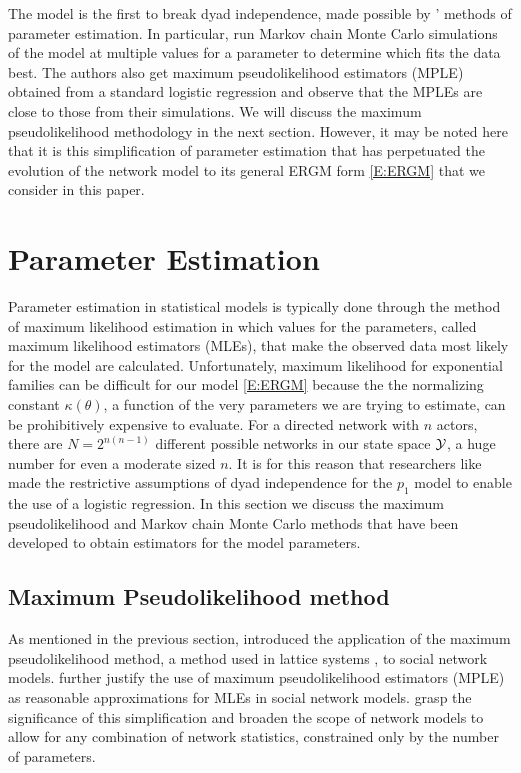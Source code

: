 The model is the first to break dyad independence, made possible by \citeauthor{Frank:1986}' methods of parameter estimation.  In particular, \citeauthor{Frank:1986} run Markov chain Monte Carlo simulations of the model at multiple values for a parameter to determine which fits the data best.  The authors also get maximum pseudolikelihood estimators (MPLE) obtained from a standard logistic regression and observe that the MPLEs are close to those from their simulations.  We will discuss the maximum pseudolikelihood methodology in the next section.  However, it may be noted here that it is this simplification of parameter estimation that has perpetuated the evolution of the network model to its general ERGM form \eqref{E:ERGM} that we consider in this paper.  



\section{Parameter Estimation}
Parameter estimation in statistical models is typically done through the method of maximum likelihood estimation in which values for the parameters, called maximum likelihood estimators (MLEs), that make the observed data most likely for the model are calculated.  Unfortunately, maximum likelihood for exponential families can be difficult for our model \eqref{E:ERGM} because the the normalizing constant $\kappa(\theta)$, a function of the very parameters we are trying to estimate, can be prohibitively expensive to evaluate.  For a directed network with $n$ actors, there are $N=2^{n(n-1)}$ different possible networks in our state space ${\mathcal Y}$, a huge number for even a moderate sized $n$.  It is for this reason that researchers like \citet{Holland:1981} made the restrictive assumptions of dyad independence for the $p_1$ model to enable the use of a logistic regression.  In this section we discuss the maximum pseudolikelihood and Markov chain Monte Carlo methods that have been developed to obtain estimators for the model parameters. 



\subsection{Maximum Pseudolikelihood method}
As mentioned in the previous section, \citet{Frank:1986} introduced the application of the maximum pseudolikelihood method, a method used in lattice systems \citep{Besag:1974}, to social network models.  \citet{Strauss:1990} further justify the use of maximum pseudolikelihood estimators (MPLE) as reasonable approximations for MLEs in social network models.  \citet{Wasserman:1996, Pattison:1999, logit} grasp the significance of this simplification and broaden the scope of network models to allow for any combination of network statistics, constrained only by the number of parameters. 

